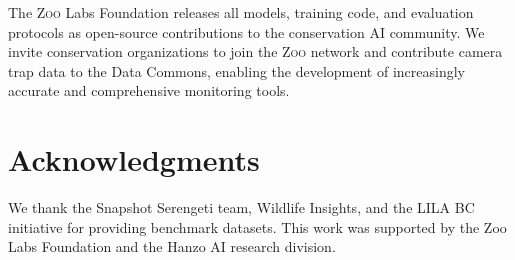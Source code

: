 \documentclass[11pt,letterpaper]{article}
\newcommand{\Zoo}{\textsc{Zoo}}
\begin{document}
The \Zoo{} Labs Foundation releases all models, training code, and evaluation protocols as open-source contributions to the conservation AI community. We invite conservation organizations to join the \Zoo{} network and contribute camera trap data to the Data Commons, enabling the development of increasingly accurate and comprehensive monitoring tools.

\section*{Acknowledgments}

We thank the Snapshot Serengeti team, Wildlife Insights, and the LILA BC initiative for providing benchmark datasets. This work was supported by the Zoo Labs Foundation and the Hanzo AI research division.
\end{document}
